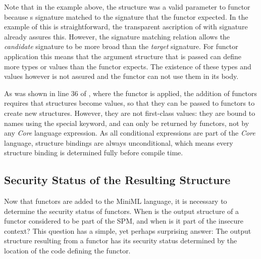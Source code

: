 \documentclass[10pt,a4paper,master=cws, masteroption=ai,english,inputenc=utf8]{kulemt}
\begin{document}
\noindent Note that in the example above, the structure  was a valid parameter to functor  because s signature matched to the  signature that the functor expected. In the example of  this is straightforward, the transparent ascription of  with signature  already assures this.
However, the signature matching relation allows the \emph{candidate} signature to be more broad than the \emph{target} signature.
For functor application this means that the argument structure that is passed can define more types or values than the functor expects.
The existence of these types and values however is not assured and the functor can not use them in its body. 

\smallskip

As was shown in line 36 of , where the  functor is applied, the addition of functors requires that structures become values, so that they can be passed to functors to create new structures.
However, they are not first-class values: they are bound to names using the special  keyword, and can only be returned by functors, not by any \emph{Core} language expression.
As all conditional expressions are part of the \emph{Core} language, structure bindings are always unconditional, which means every structure binding is determined fully before compile time.

\subsection{Security Status of the Resulting Structure\label{sec:FunctorSecurityStatus}}
Now that functors are added to the MiniML language, it is necessary to determine the security status of functors. 
When is the output structure of a functor considered to be part of the SPM, and when is it part of the insecure context?
This question has a simple, yet perhaps surprising answer:
The output structure resulting from a functor has its security status determined by the location of the code defining the functor.
\end{document}
